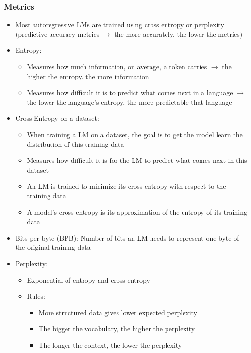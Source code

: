 \documentclass[11pt]{scrartcl}
\begin{document}
\subsubsection*{Metrics}
\begin{itemize}
	\item Most autoregressive LMs are trained using cross entropy or perplexity (predictive accuracy metrics $\to$ the more accurately, the lower the metrics)
	\item Entropy:
	\begin{itemize}
		\item Measures how much information, on average, a token carries $\to$ the higher the entropy, the more information
		\item Measures how difficult it is to predict what comes next in a language $\to$ the lower the language's entropy, the more predictable that language
	\end{itemize}
	\item Cross Entropy on a dataset:
	\begin{itemize}
		\item When training a LM on a dataset, the goal is to get the model learn the distribution of this training data
		\item Measures how difficult it is for the LM to predict what comes next in this dataset
		\item An LM is trained to minimize its cross entropy with respect to the training data
		\item A model's cross entropy is its approximation of the entropy of its training data
	\end{itemize}
	\item Bits-per-byte (BPB): Number of bits an LM needs to represent one byte of the original training data
	\item Perplexity: 
	\begin{itemize}
		\item Exponential of entropy and cross entropy
		\item Rules:
		\begin{itemize}
			\item More structured data gives lower expected perplexity
			\item The bigger the vocabulary, the higher the perplexity
			\item The longer the context, the lower the perplexity
		\end{itemize}
	\end{itemize}
\end{itemize}
\end{document}
